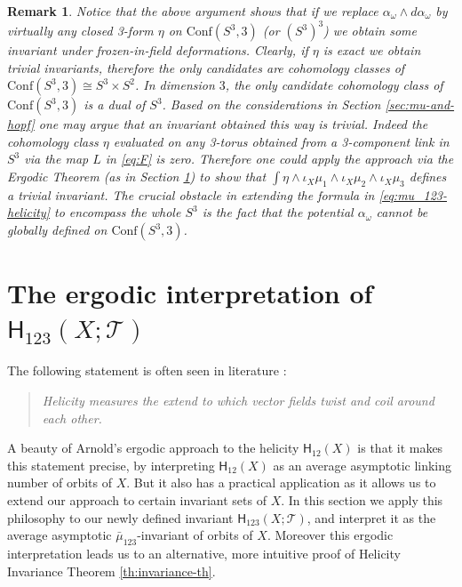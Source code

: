 \documentclass[12pt]{article}
\newtheorem{rem}[theorem]{Remark}
\newenvironment{remark}{\begin{rem} \rm}{\end{rem}}
\newcommand{\Cnf}{\text{Conf}}
\newcommand{\no}{\noindent}
\begin{document}

\begin{remark}
 Notice that the above argument shows that if we replace $\alpha_{\omega}\wedge d\alpha_\omega$ by virtually any closed 3-form $\eta$ on $\Cnf(S^3,3)$ (or $(S^3)^3$) we obtain some invariant under frozen-in-field deformations. Clearly, if $\eta$ is exact we obtain trivial invariants, therefore the only candidates are cohomology classes of $\Cnf(S^3,3)\cong S^3\times S^2$. In dimension $3$, the only candidate cohomology class of $\Cnf(S^3,3)$ is a dual of $S^3$. Based on the considerations in Section \ref{sec:mu-and-hopf}
  one may argue that an invariant obtained this way is trivial. Indeed the cohomology class $\eta$ evaluated on any 3-torus obtained from a 3-component link in $S^3$ via the map $L$ in \eqref{eq:F}
  is zero. Therefore one could apply the approach via the Ergodic Theorem (as in Section \ref{sec:ergodic}) to show that $\int \eta\wedge\iota_{X}\mu_1\wedge \iota_{X}\mu_2\wedge \iota_{X}\mu_3$ 
 defines a trivial invariant.
  The crucial obstacle in extending the formula in \eqref{eq:mu_123-helicity} to encompass the whole $S^3$ is the fact that the potential $\alpha_\omega$ cannot be globally defined on $\Cnf(S^3,3)$.
\end{remark}

\section{The ergodic interpretation of $\mathsf{H}_{123}(X;\mathcal{T})$}\label{sec:ergodic}

The following statement is often seen in literature \cite{Cantarella-DeTurck-Gluck01, Cantarella-DeTurck-Gluck-Teytel00}: 

\begin{quote}
\emph{Helicity measures the extend to which 
vector fields twist and coil around each other.}
\end{quote}

\no A beauty of Arnold's ergodic approach 
to the helicity $\mathsf{H}_{12}(X)$ is that it makes this statement precise, by interpreting 
$\mathsf{H}_{12}(X)$ as an average asymptotic linking number of orbits of $X$. But it also has a
practical application as it allows us to extend our approach to certain invariant sets of $X$. In this section we apply 
this philosophy to our newly defined invariant $\mathsf{H}_{123}(X;\mathcal{T})$, and interpret it
as the average asymptotic $\bar{\mu}_{123}$-invariant of orbits of $X$. 
Moreover this ergodic interpretation leads us to an alternative, more intuitive proof of Helicity Invariance Theorem \ref{th:invariance-th}.
\end{document}
